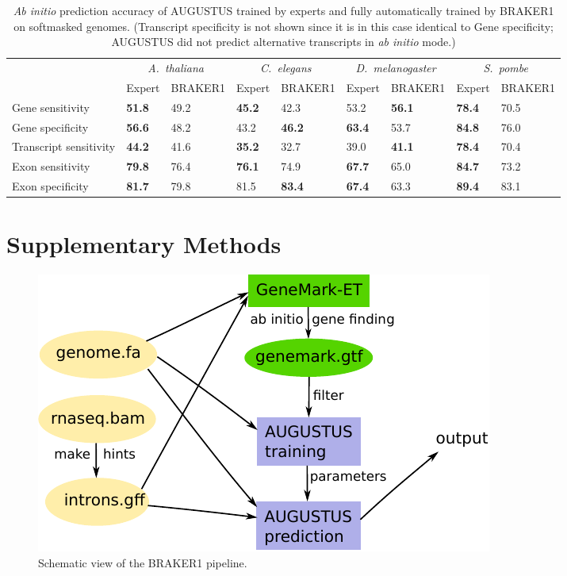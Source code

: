 \documentclass[a4paper,10pt]{report}
\begin{document}
\begin{table}
\caption{\textit{Ab initio} prediction accuracy of AUGUSTUS trained by experts and fully automatically trained by BRAKER1 on softmasked genomes. (Transcript specificity is not shown since it is in this case identical to Gene specificity; AUGUSTUS did not predict alternative transcripts in \textit{ab initio} mode.) \label{single_preds_braker}}
\begin{tabular}{lp{1.5cm}p{1.2cm}p{1.2cm}p{1.2cm}p{1.2cm}p{1.2cm}p{1.2cm}p{1.2cm}}\hline
 & \multicolumn{2}{c}{\textit{A.~thaliana}} &  \multicolumn{2}{c}{\textit{C.~elegans}} &  \multicolumn{2}{c}{\textit{D.~melanogaster}} &  \multicolumn{2}{c}{\textit{S.~pombe}}\\
 & \tiny{Expert} & \tiny{BRAKER1} & \tiny{Expert} & \tiny{BRAKER1} &  \tiny{Expert} & \tiny{BRAKER1} & \tiny{Expert} &\tiny{BRAKER1}\\
 \hline
Gene sensitivity        & \textbf{51.8} & 49.2 & \textbf{45.2} & 42.3 & 53.2 & \textbf{56.1} & \textbf{78.4} & 70.5 \\
Gene specificity        & \textbf{56.6} & 48.2 & 43.2 & \textbf{46.2} & \textbf{63.4} & 53.7 & \textbf{84.8} & 76.0  \\
Transcript sensitivity  & \textbf{44.2} & 41.6 & \textbf{35.2} & 32.7 & 39.0 & \textbf{41.1} & \textbf{78.4} & 70.4  \\
Exon sensitivity        & \textbf{79.8} & 76.4 & \textbf{76.1} & 74.9 & \textbf{67.7} & 65.0 & \textbf{84.7} & 73.2  \\
Exon specificity        & \textbf{81.7} & 79.8 & 81.5 & \textbf{83.4} & \textbf{67.4} & 63.3 & \textbf{89.4} & 83.1  \\
\hline
\end{tabular}
\end{table}

\chapter{Supplementary Methods}

\begin{figure}[!tpb]%
\centerline{\includegraphics[width=0.7\linewidth]{figs/Figure1.pdf}}
\caption{Schematic view of the BRAKER1 pipeline.}\label{pipeline}
\end{figure}
\end{document}
